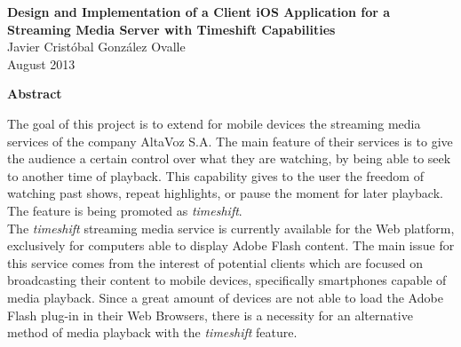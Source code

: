 \newpage
\begin{center}
 \Large \textbf{Design and Implementation of a Client iOS Application for a Streaming Media Server with Timeshift Capabilities}\\
  

\normalsize Javier Cristóbal González Ovalle \\
\normalsize August 2013

\Large \textbf{Abstract}

\end{center}
\normalsize

The goal of this project is to extend for mobile devices the streaming media services of the company AltaVoz S.A. The main feature of their services is to give the audience a certain control over what they are watching, by being able to seek to another time of playback. This capability gives to the user the freedom of watching past shows, repeat highlights, or pause the moment for later playback. The feature is being promoted as \textit{timeshift}.\\



The \textit{timeshift} streaming media service is currently available for the Web platform, exclusively for computers able to display Adobe Flash content. The main issue for this service comes from the interest of potential clients which are focused on broadcasting their content to mobile devices, specifically smartphones capable of media playback. Since a great amount of devices are not able to load the Adobe Flash plug-in in their Web Browsers, there is a necessity for an alternative method of media playback with the \textit{timeshift} feature.\\

